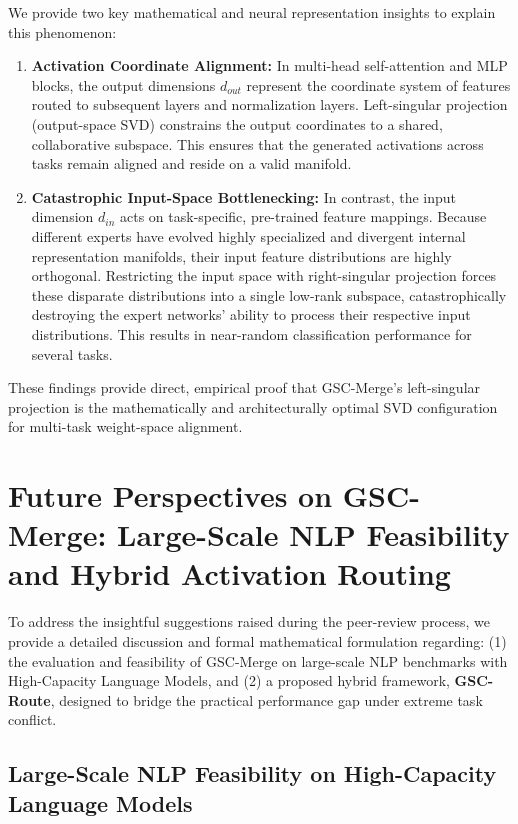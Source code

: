 \documentclass{article}
\theoremstyle{plain}
\theoremstyle{definition}
\theoremstyle{remark}
\begin{document}
We provide two key mathematical and neural representation insights to explain this phenomenon:
\begin{enumerate}
    \item \textbf{Activation Coordinate Alignment:} In multi-head self-attention and MLP blocks, the output dimensions $d_{out}$ represent the coordinate system of features routed to subsequent layers and normalization layers. Left-singular projection (output-space SVD) constrains the output coordinates to a shared, collaborative subspace. This ensures that the generated activations across tasks remain aligned and reside on a valid manifold.
    \item \textbf{Catastrophic Input-Space Bottlenecking:} In contrast, the input dimension $d_{in}$ acts on task-specific, pre-trained feature mappings. Because different experts have evolved highly specialized and divergent internal representation manifolds, their input feature distributions are highly orthogonal. Restricting the input space with right-singular projection forces these disparate distributions into a single low-rank subspace, catastrophically destroying the expert networks' ability to process their respective input distributions. This results in near-random classification performance for several tasks.
\end{enumerate}

These findings provide direct, empirical proof that GSC-Merge's left-singular projection is the mathematically and architecturally optimal SVD configuration for multi-task weight-space alignment.

\section{Future Perspectives on GSC-Merge: Large-Scale NLP Feasibility and Hybrid Activation Routing}
\label{appendix:future_perspectives}

To address the insightful suggestions raised during the peer-review process, we provide a detailed discussion and formal mathematical formulation regarding: (1) the evaluation and feasibility of GSC-Merge on large-scale NLP benchmarks with High-Capacity Language Models, and (2) a proposed hybrid framework, \textbf{GSC-Route}, designed to bridge the practical performance gap under extreme task conflict.

\subsection{Large-Scale NLP Feasibility on High-Capacity Language Models}
\end{document}
